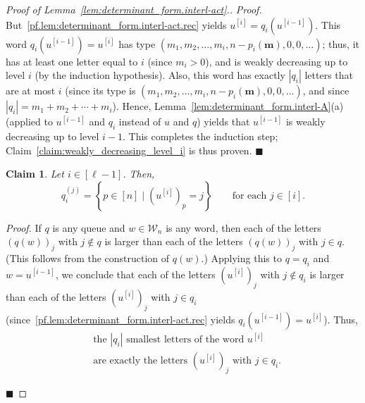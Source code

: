 \documentclass[reqno]{amsart}
\newcommand{\0}{\phantom{c}}
\newcommand{\mm}{\mathbf{m}}
\newcommand{\mcW}{\mathcal{W}}
\newenvironment{subproof}{\textit{Proof.} }{\hfill$\blacksquare$\medskip}
\newcommand{\set}[1]{\left\{ #1 \right\}}
\newcommand{\abs}[1]{\left| #1 \right|}
\newcommand{\tup}[1]{\left( #1 \right)}
\newcommand{\ive}[1]{\left[ #1 \right]}
\theoremstyle{plain}
\newtheorem{claim}[thm]{Claim}
\theoremstyle{definition}
\numberwithin{equation}{section}
\begin{document}
\begin{proof}[Proof of Lemma~\ref{lem:determinant_form.interl-act}.]
\begin{subproof}
But~\eqref{pf.lem:determinant_form.interl-act.rec} yields $u^{\left[  i\right]} = q_i\left(  u^{\left[  i-1\right]  }\right)$.
This word $q_i\left(  u^{\left[  i-1\right]  }\right) = u^{\left[  i\right]}$ has type $\tup{m_1, m_2, \dotsc, m_i, n-p_i(\mm), 0, 0, \ldots}$; thus, it has at least one letter equal to $i$ (since $m_i > 0$), and is weakly decreasing up to level $i$ (by the induction hypothesis).
Also, this word has exactly $\abs{q_i}$ letters that are at most $i$ (since its type is $\tup{m_1, m_2, \dotsc, m_i, n-p_i(\mm), 0, 0, \ldots}$, and since $\abs{q_i} = m_1 + m_2 + \cdots + m_i$).
Hence, Lemma~\ref{lem:determinant_form.interl-A}(a) (applied to $u^{\left[i-1\right]}$ and $q_i$ instead of $u$ and $q$)
yields that $u^{\left[i-1\right]}$ is weakly decreasing up to level $i-1$.
This completes the induction step; Claim~\ref{claim:weakly_decreasing_level_i} is thus proven.
\end{subproof}

\begin{claim}
\label{claim:description_q_i^(j)}
Let $i\in \ive{\ell-1}$. Then,
\[
q_i^{(j)} = \set{ p \in \ive{n} \mid \left( u^{\left[  i\right] } \right)_p = j }
\qquad \text{for each } j \in \ive{i} .
\]
\end{claim}

\begin{subproof}
If $q$ is any queue and $w \in \mcW_n$ is any word, then each of the letters $(q(w))_j$ with $j \notin q$ is larger than each of the letters $(q(w))_j$ with $j \in q$.
(This follows from the construction of $q(w)$.)
Applying this to $q = q_i$ and $w = u^{\left[i-1\right]}$, we conclude that
each of the letters $(u^{\left[  i\right]})_j$ with $j \notin q_i$ is larger than each of the letters $(u^{\left[  i\right]})_j$ with $j \in q_i$
(since~\eqref{pf.lem:determinant_form.interl-act.rec} yields $q_i\left(  u^{\left[  i-1\right]  }\right) = u^{\left[  i\right]}$).
Thus,
\begin{equation}
\label{pf.claim:description_q_i^(j).1}
\begin{split}
&\text{the $\abs{q_i}$ smallest letters of the word $u^{\left[  i\right]}$} \\
&\text{are exactly the letters $(u^{\left[  i\right]})_j$ with $j \in q_i$} .
\end{split}
\end{equation}


\end{subproof}
\end{proof}
\end{document}
